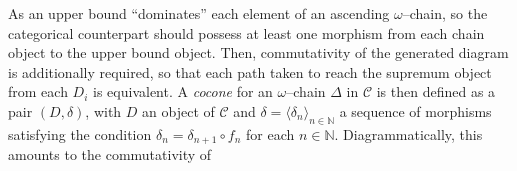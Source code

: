 As an upper bound ``dominates'' each element of an ascending \(\omega\)--chain, so the categorical counterpart should possess at least one morphism from each chain object to the upper bound object. %
Then, commutativity of the generated diagram is additionally required, so that each path taken to reach the supremum object from each \(D_i\) is equivalent.
A \emph{cocone} for an \(\omega\)--chain \(\Delta\) in \(\mathcal{C}\) is %
then defined as a pair \((D, \delta)\), with \(D\) an object of
\(\mathcal{C}\) and \(\delta = {\langle\delta_n\rangle}_{n\in\mathbb{N}}\)
a sequence of morphisms satisfying the condition
\(\delta_n = \delta_{n+1} \circ f_n\) for each \(n \in \mathbb{N}\). Diagrammatically, this amounts to the commutativity of
  \begin{center}
  \end{center}

